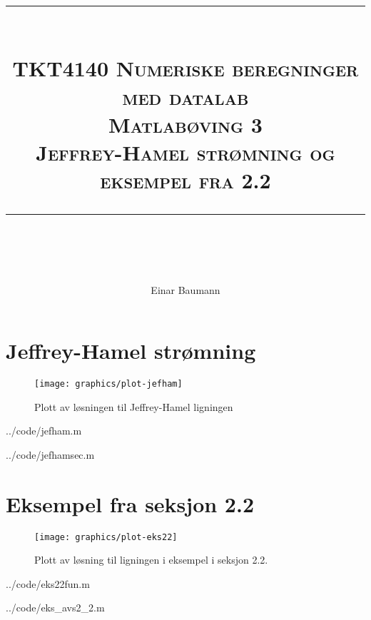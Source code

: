 




\author{Einar Baumann}
\title{
    \vspace{-1in}
    \vspace{0.1in}
    \rule{\textwidth}{0.5pt} \\[0.5cm]
    \normalfont \normalsize \textsc{TKT4140 Numeriske beregninger med datalab} \\ [20pt]
    {\textsc{ \huge Matlabøving 3 }} \\ [0.5cm]
    {\textsc {\Large Jeffrey-Hamel strømning og eksempel fra 2.2} } \\
    \vspace{0.1in}
    \rule{\textwidth}{2pt} \\[0.7cm]
}


\maketitle
\thispagestyle{empty}
\clearpage

\section{Jeffrey-Hamel strømning} %
\label{sec:jeffrey_hamel_str_mning}

\begin{figure}[htbp]
  \centering
  \texttt{[image: graphics/plot-jefham]}
  \caption{Plott av løsningen til Jeffrey-Hamel ligningen}
  \label{fig:label}
\end{figure}


  {../code/jefham.m}


  {../code/jefhamsec.m}



\clearpage
\section{Eksempel fra seksjon 2.2} %
\label{sec:eksempel_fra_seksjon_2_2}

\begin{figure}[htbp]
  \centering
  \texttt{[image: graphics/plot-eks22]}
  \caption{Plott av løsning til ligningen i eksempel i seksjon 2.2.}
  \label{fig:eks22}
\end{figure}


  {../code/eks22fun.m}


  {../code/eks_avs2_2.m}





